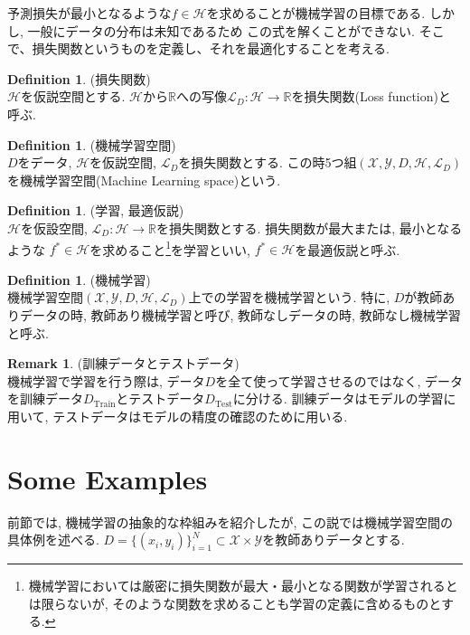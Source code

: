 \documentclass[11pt, a4paper, dvipdfmx]{jsarticle}
\theoremstyle{definition}
\newtheorem{Definition+}[Axiom+]{Definition}
\newtheorem{Remark+}[Axiom+]{Remark}
\newcommand{\R}{\mathbb{R}}
\newcommand{\X}{\mathcal{X}}
\newcommand{\Y}{\mathcal{Y}}
\newcommand{\Hil}{\mathcal{H}}
\newcommand{\Loss}{\mathcal{L}_{D}}
\newcommand{\MLsp}{(\X, \Y, D, \Hil, \Loss)}
\begin{document}
予測損失が最小となるような$f\in\Hil$を求めることが機械学習の目標である. しかし, 一般にデータの分布は未知であるため
この式を解くことができない. そこで、損失関数というものを定義し、それを最適化することを考える.
\begin{Definition+}(損失関数)\\
    $\Hil$を仮説空間とする. $\Hil$から$\R$への写像$\Loss:\Hil\to\R$を損失関数(Loss function)と呼ぶ.
\end{Definition+}
\begin{Definition+}(機械学習空間)\\
    $D$をデータ, $\Hil$を仮説空間, $\Loss$を損失関数とする. 
    この時5つ組$\MLsp$を機械学習空間(Machine Learning space)という.
\end{Definition+}
\begin{Definition+}(学習, 最適仮説)\\
    $\Hil$を仮設空間, $\Loss:\Hil\to\R$を損失関数とする. 損失関数が最大または, 最小となるような
    $f^*\in\Hil$を求めること\footnote{機械学習においては厳密に損失関数が最大・最小となる関数が学習されるとは限らないが, そのような関数を求めることも学習の定義に含めるものとする. }を学習といい, $f^*\in\Hil$を最適仮説と呼ぶ.
\end{Definition+}
\begin{Definition+}(機械学習)\\
    機械学習空間$\MLsp$上での学習を機械学習という. 特に, $D$が教師ありデータの時, 教師あり機械学習と呼び, 
    教師なしデータの時, 教師なし機械学習と呼ぶ.
\end{Definition+}
\begin{Remark+}(訓練データとテストデータ)\\
    機械学習で学習を行う際は, データ$D$を全て使って学習させるのではなく, 
    データを訓練データ$D_{\text{Train}}$とテストデータ$D_{\text{Test}}$に分ける. 
    訓練データはモデルの学習に用いて, テストデータはモデルの精度の確認のために用いる. 
\end{Remark+}
\section{Some Examples}
前節では, 機械学習の抽象的な枠組みを紹介したが, この説では機械学習空間の具体例を述べる.
$D = \{(x_i, y_i)\}_{i = 1}^{N}\subset\X\times\Y$を教師ありデータとする.
\end{document}
